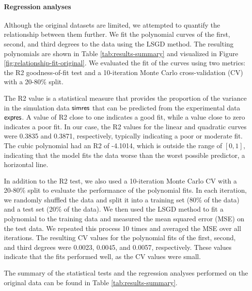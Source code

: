 \paragraph{Regression analyses}

Although the original datasets are limited, we attempted to quantify the relationship between them further. We fit the polynomial curves of the first, second, and third degrees to the data using the LSGD method. The resulting polynomials are shown in Table \ref{tab:results-summary} and visualized in Figure \ref{fig:relationship-fit-original}. We evaluated the fit of the curves using two metrics: the R2 goodness-of-fit test and a 10-iteration Monte Carlo cross-validation (CV) with a 20-80\% split. 

The R2 value is a statistical measure that provides the proportion of the variance in the simulation data $\mathsf{simres}$ that can be predicted from the experimental data $\mathsf{expres}$. A value of R2 close to one indicates a good fit, while a value close to zero indicates a poor fit. In our case, the R2 values for the linear and quadratic curves were 0.3835 and 0.3871, respectively, typically indicating a poor or moderate fit. The cubic polynomial had an R2 of -4.1014, which is outside the range of $[0, 1]$, indicating that the model fits the data worse than the worst possible predictor, a horizontal line.

In addition to the R2 test, we also used a 10-iteration Monte Carlo CV with a 20-80\% split to evaluate the performance of the polynomial fits. In each iteration, we randomly shuffled the data and split it into a training set (80\% of the data) and a test set (20\% of the data). We then used the LSGD method to fit a polynomial to the training data and measured the mean squared error (MSE) on the test data. We repeated this process 10 times and averaged the MSE over all iterations. The resulting CV values for the polynomial fits of the first, second, and third degrees were 0.0023, 0.0045, and 0.0057, respectively. These values indicate that the fits performed well, as the CV values were small.

The summary of the statistical tests and the regression analyses performed on the original data can be found in Table \ref{tab:results-summary}.